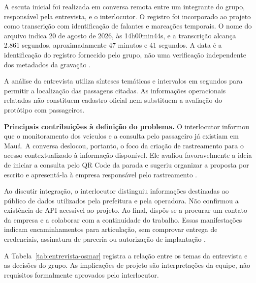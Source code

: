\documentclass[12pt,oneside,a4paper,brazil]{abntex2}
\begin{document}
A escuta inicial foi realizada em conversa remota entre um integrante do grupo, responsável pela entrevista, e o interlocutor. O registro foi incorporado ao projeto como transcrição com identificação de falantes e marcações temporais. O nome do arquivo indica 20 de agosto de 2026, às 14h00min44s, e a transcrição alcança 2.861 segundos, aproximadamente 47 minutos e 41 segundos. A data é a identificação do registro fornecido pelo grupo, não uma verificação independente dos metadados da gravação \citep{entrevistaosmar2026}.

A análise da entrevista utiliza sínteses temáticas e intervalos em segundos para permitir a localização das passagens citadas. As informações operacionais relatadas não constituem cadastro oficial nem substituem a avaliação do protótipo com passageiros.

\textbf{Principais contribuições à definição do problema.} O interlocutor informou que o monitoramento dos veículos e a consulta pelo passageiro já existiam em Mauá. A conversa deslocou, portanto, o foco da criação de rastreamento para o acesso contextualizado à informação disponível. Ele avaliou favoravelmente a ideia de iniciar a consulta pelo QR Code da parada e sugeriu organizar a proposta por escrito e apresentá-la à empresa responsável pelo rastreamento \citep[447--589 s; 739--853 s; 1135--1163 s]{entrevistaosmar2026}.

Ao discutir integração, o interlocutor distinguiu informações destinadas ao público de dados utilizados pela prefeitura e pela operadora. Não confirmou a existência de API acessível ao projeto. Ao final, dispôs-se a procurar um contato da empresa e a colaborar com a continuidade do trabalho. Essas manifestações indicam encaminhamentos para articulação, sem comprovar entrega de credenciais, assinatura de parceria ou autorização de implantação \citep[861--919 s; 2293--2425 s]{entrevistaosmar2026}.

A Tabela~\ref{tab:entrevista-osmar} registra a relação entre os temas da entrevista e as decisões do grupo. As implicações de projeto são interpretações da equipe, não requisitos formalmente aprovados pelo interlocutor.
\end{document}
